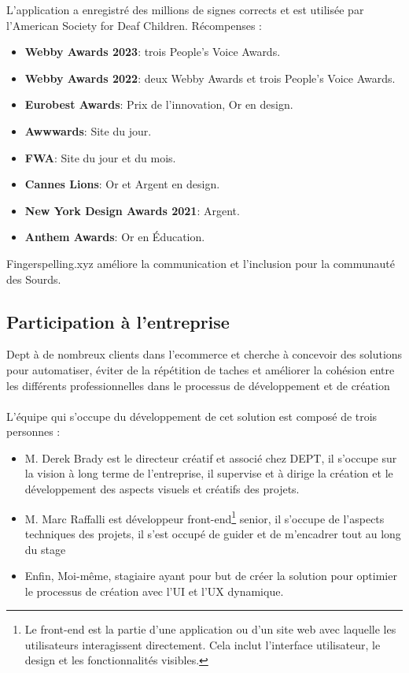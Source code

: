 L'application a enregistré des millions de signes corrects et est utilisée par l'American Society for Deaf Children. Récompenses :
\begin{itemize}
    \item \textbf{Webby Awards 2023}: trois People's Voice Awards. 
    \item \textbf{Webby Awards 2022}: deux Webby Awards et trois People's Voice Awards.
    \item \textbf{Eurobest Awards}: Prix de l'innovation, Or en design.
    \item \textbf{Awwwards}: Site du jour.
    \item \textbf{FWA}: Site du jour et du mois.
    \item \textbf{Cannes Lions}: Or et Argent en design.
    \item \textbf{New York Design Awards 2021}: Argent.
    \item \textbf{Anthem Awards}: Or en Éducation.
\end{itemize}

Fingerspelling.xyz améliore la communication et l'inclusion pour la communauté des Sourds.

\subsection{Participation à l'entreprise}

Dept à de nombreux clients dans l'ecommerce et cherche à concevoir des solutions pour automatiser, éviter de la répétition de taches et améliorer la cohésion entre les différents professionnelles dans le processus de développement et de création
\\ \\
L’équipe qui s’occupe du développement de cet solution est composé de trois personnes : 
\begin{itemize}
    \item M. Derek Brady est le directeur créatif et associé chez DEPT, il s'occupe sur la vision à long terme de l'entreprise, il supervise et à dirige la création et le développement des aspects visuels et créatifs des projets.
    \item M. Marc Raffalli est développeur front-end\footnote{Le front-end est la partie d'une application ou d'un site web avec laquelle les utilisateurs interagissent directement. Cela inclut l'interface utilisateur, le design et les fonctionnalités visibles.} senior, il s'occupe de l'aspects techniques des projets, il s'est occupé de guider et de m'encadrer tout au long du stage
    \item Enfin, Moi-même, stagiaire ayant pour but de créer la solution pour optimier le processus de création avec l'UI et l'UX dynamique.
\end{itemize}

